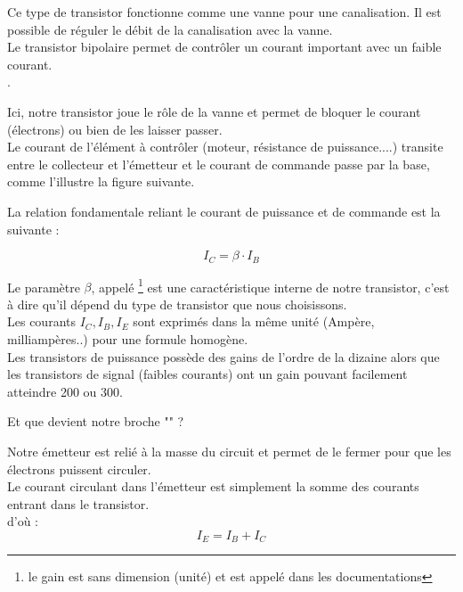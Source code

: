 Ce type de transistor fonctionne comme une vanne pour une canalisation. Il est possible de réguler le débit de la canalisation avec la vanne. \\

Le transistor bipolaire permet de contrôler un courant important avec un faible courant.\\

.

Ici, notre transistor joue le rôle de la vanne et permet de bloquer le courant (électrons) ou bien de les laisser passer. \\


Le courant de l'élément à contrôler (moteur, résistance de puissance....) transite entre le collecteur et l'émetteur et le courant de commande passe par la base, comme l'illustre la figure suivante.\\


La relation fondamentale reliant le courant de puissance et de commande est la suivante : 

$$ \boxed{ I_{C} = \beta \cdot I_{B} }$$

Le paramètre $\beta$, appelé \footnote{le gain est sans dimension (unité) et est appelé  dans les documentations} est une caractéristique interne de notre transistor, c'est à dire qu'il dépend du type de transistor que nous choisissons.\\
Les courants $I_{C}, I_{B},I_{E}$ sont exprimés dans la même unité (Ampère, milliampères..) pour une formule homogène.\\

Les transistors de puissance possède des gains de l'ordre de la dizaine alors que les transistors de signal (faibles courants) ont un gain pouvant facilement atteindre 200 ou 300.


\begin{question}
  Et que devient notre broche "" ?
\end{question} 

\begin{reponse}
  
  Notre émetteur est relié à la masse du circuit et permet de le fermer pour que les électrons puissent circuler.\\

  Le courant circulant dans l'émetteur est simplement la somme des courants entrant dans le transistor. \\
  d'où : $$ \boxed{ I_{E} = I_{B} + I_{C} }$$

  \end{reponse}



